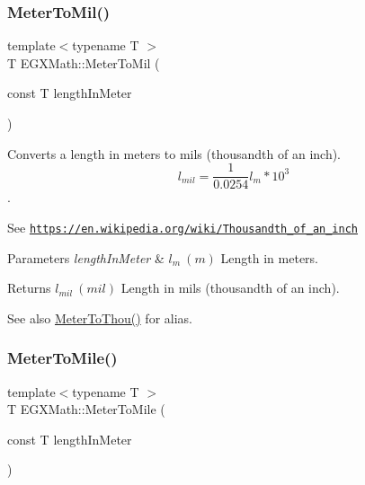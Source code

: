 \subsubsection{\texorpdfstring{Meter\+To\+Mil()}{MeterToMil()}}
{\footnotesize\ttfamily template$<$typename T $>$ \\
T E\+G\+X\+Math\+::\+Meter\+To\+Mil (\begin{DoxyParamCaption}\item[{const T}]{length\+In\+Meter }\end{DoxyParamCaption})}



Converts a length in meters to mils (thousandth of an inch). \[ l_{mil}= \frac{1}{0.0254} l_{m} * 10^{3} \]. 

See \href{https://en.wikipedia.org/wiki/Thousandth_of_an_inch}{\tt https\+://en.\+wikipedia.\+org/wiki/\+Thousandth\+\_\+of\+\_\+an\+\_\+inch} 
\begin{DoxyParams}{Parameters}
{\em length\+In\+Meter} & $ l_{m}\ (m)$ Length in meters. \\
\hline
\end{DoxyParams}
\begin{DoxyReturn}{Returns}
$ l_{mil}\ (mil)$ Length in mils (thousandth of an inch). 
\end{DoxyReturn}
\begin{DoxySeeAlso}{See also}
\mbox{\hyperlink{group___e_g_x_math-_conversions-_length_conversions-_s_i-_meter-_imperial_gaebe39a6b8485aae53724390225f27a66}{Meter\+To\+Thou()}} for alias. 
\end{DoxySeeAlso}
\mbox{\label{group___e_g_x_math-_conversions-_length_conversions-_s_i-_meter-_imperial_gad99b2a17c589bee13f354975b326fe74}} 
\subsubsection{\texorpdfstring{Meter\+To\+Mile()}{MeterToMile()}}
{\footnotesize\ttfamily template$<$typename T $>$ \\
T E\+G\+X\+Math\+::\+Meter\+To\+Mile (\begin{DoxyParamCaption}\item[{const T}]{length\+In\+Meter }\end{DoxyParamCaption})}



